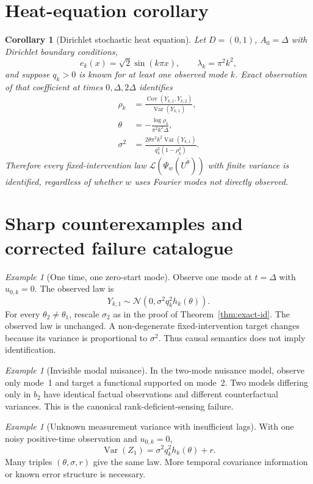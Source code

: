 \documentclass[11pt]{article}
\newtheorem{corollary}[assumption]{Corollary}
\theoremstyle{remark}
\newtheorem{example}[assumption]{Example}
\newcommand{\Law}{\mathcal L}
\newcommand{\Cov}{\operatorname{Cov}}
\newcommand{\Var}{\operatorname{Var}}
\newcommand{\1}{\mathbf 1}
\begin{document}
\section{Heat-equation corollary}

\begin{corollary}[Dirichlet stochastic heat equation]\label{cor:heat}
Let $D=(0,1)$, $A_0=\Delta$ with Dirichlet boundary conditions,
\[
 e_k(x)=\sqrt2\sin(k\pi x),
 \qquad
 \lambda_k=\pi^2k^2,
\]
and suppose $q_k>0$ is known for at least one observed mode $k$.  Exact observation of that coefficient at times $0,\Delta,2\Delta$ identifies
\begin{align}
 \rho_k&=
 \frac{\Cov(Y_{k,1},Y_{k,2})}{\Var(Y_{k,1})},\\
 \theta&=-\frac{\log\rho_k}{\pi^2k^2\Delta},\\
 \sigma^2&=
 \frac{2\theta\pi^2k^2\Var(Y_{k,1})}
 {q_k^2(1-\rho_k^2)}.
\end{align}
Therefore every fixed-intervention law
$\Law(\Psi_w(U^{\widetilde\theta}))$ with finite variance is identified, regardless of whether $w$ uses Fourier modes not directly observed.
\end{corollary}

\section{Sharp counterexamples and corrected failure catalogue}

\begin{example}[One time, one zero-start mode]\label{ex:one-time}
Observe one mode at $t=\Delta$ with $u_{0,k}=0$.  The observed law is
\[
 Y_{k,1}\sim\mathcal N(0,\sigma^2q_k^2h_k(\theta)).
\]
For every $\theta_2\ne\theta_1$, rescale $\sigma_2$ as in the proof of Theorem~\ref{thm:exact-id}.  The observed law is unchanged.  A non-degenerate fixed-intervention target changes because its variance is proportional to $\sigma^2$.  Thus causal semantics does not imply identification.
\end{example}

\begin{example}[Invisible modal nuisance]\label{ex:invisible}
In the two-mode nuisance model, observe only mode~1 and target a functional supported on mode~2.  Two models differing only in $b_2$ have identical factual observations and different counterfactual variances.  This is the canonical rank-deficient-sensing failure.
\end{example}

\begin{example}[Unknown measurement variance with insufficient lags]\label{ex:measurement}
With one noisy positive-time observation and $u_{0,k}=0$,
\[
 \Var(Z_1)=\sigma^2q_k^2h_k(\theta)+r.
\]
Many triples $(\theta,\sigma,r)$ give the same law.  More temporal covariance information or known error structure is necessary.
\end{example}
\end{document}
